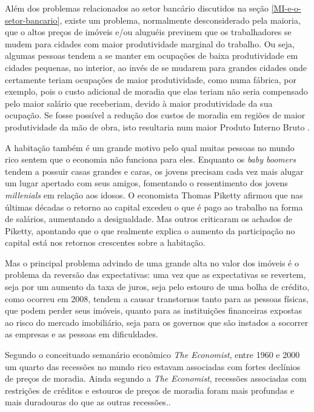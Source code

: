 \documentclass[
	12pt,				%
	oneside,			%
	a4paper,			%
	chapter=TITLE,		%
	section=TITLE,		%
	english,			%
	brazil				%
	]{abntex2}
\begin{document}
Além dos problemas relacionados ao setor bancário discutidos na seção
\ref{MI-e-o-setor-bancario}, existe um problema, normalmente desconsiderado
pela maioria, que o altos preços de imóveis e/ou aluguéis previnem que os
trabalhadores se mudem para cidades com maior produtividade marginal do
trabalho. Ou seja, algumas pessoas tendem a se manter em ocupações de baixa
produtividade em cidades pequenas, no interior, ao invés de se mudarem para
grandes cidades onde certamente teriam ocupações de maior produtividade, como
numa fábrica, por exemplo, pois o custo adicional de moradia que elas teriam não
seria compensado pelo maior salário que receberiam, devido à maior produtividade
da sua ocupação. Se fosse possível a redução dos custos de moradia em regiões de
maior produtividade da mão de obra, isto resultaria num maior Produto Interno
Bruto \autocites[149]{Case2000}{economist-housing-2020}.
\begin{citacao}
A habitação também é um grande motivo pelo qual muitas pessoas no mundo rico
sentem que o economia não funciona para eles. Enquanto os \emph{baby boomers}
tendem a possuir casas grandes e caras, os jovens precisam cada vez mais alugar
um lugar apertado com seus amigos, fomentando o ressentimento dos jovens
\emph{millenials} em relação aos idosos. O economista Thomas Piketty afirmou que
nas últimas décadas o retorno ao capital excedeu o que é pago ao trabalho na
forma de salários, aumentando a desigualdade. Mas outros criticaram os achados
de Piketty, apontando que o que realmente explica o aumento da participação no
capital está nos retornos crescentes sobre a habitação.
\cite{economist-housing-2020}
\end{citacao}
Mas o principal problema advindo de uma grande alta no valor dos imóveis é o
problema da reversão das expectativas: uma vez que as expectativas se revertem,
seja por um aumento da taxa de juros, seja pelo estouro de uma bolha de crédito,
como ocorreu em 2008, tendem a causar transtornos tanto para as pessoas físicas,
que podem perder seus imóveis, quanto para as instituições financeiras expostas
ao risco do mercado imobiliário, seja para os governos que são instados a
socorrer as empresas e as pessoas em dificuldades.

Segundo o conceituado semanário econômico \emph{The Economist}, entre 1960 e 2000 um
quarto das recessões no mundo rico estavam associadas com fortes declínios de
preços de moradia. Ainda segundo a \emph{The Economist}, recessões associadas com
restrições de créditos e estouros de preços de moradia foram mais profundas e
mais duradouras do que as outras recessões.\autocite{economist-housing-2020}.
\end{document}
